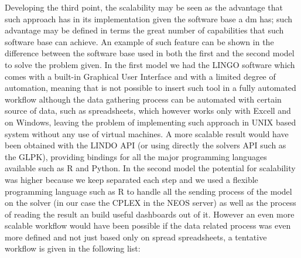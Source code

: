 \begin{doublespace}
Developing the third point, the scalability may be seen as the advantage that such approach has in its implementation given the software base a \gls{dm} has; such advantage may be defined in terms the great number of capabilities that such software base can achieve. An example of such feature can be shown in the difference between the software base used in both the first and the second model to solve the problem given.
In the first model we had the LINGO software which comes with a built-in Graphical User Interface and  with a limited degree of automation, meaning that is not possible to insert such tool in a fully automated workflow although the data gathering process can be automated with certain source of data, such as spreadsheets, which however works only with Excell and on Windows, leaving the problem of implementing such approach in UNIX based system without any use of virtual machines. A more scalable result would have been obtained with the LINDO API (or using directly the solvers API such as the GLPK\cite{Sottinen2009}),  providing bindings for all the major programming languages available such as R and Python. 
In the second model the potential for scalability was higher because we keep separated each step and we used a flexible programming language such as R to handle all the sending process of the model on the solver (in our case the CPLEX in the NEOS server) as well as the process of reading the result an build useful dashboards out of it. 
However an even more scalable workflow would have been possible if the data related process was even more defined and not just based only on spread spreadsheets, a tentative workflow is given in the following list:


\end{doublespace}
